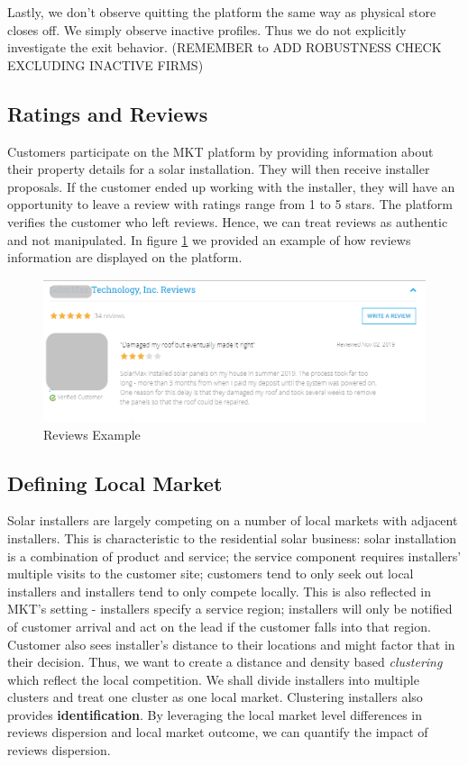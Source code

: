\documentclass[msom,blindrev]{informs3}
\begin{document}
Lastly, we don't observe quitting the platform the same way as physical store closes off. We simply observe inactive profiles. Thus we do not explicitly investigate the exit behavior. (REMEMBER to ADD ROBUSTNESS CHECK EXCLUDING INACTIVE FIRMS) 


\subsection{Ratings and Reviews}
Customers participate on the MKT platform by providing information about their property details for a solar installation. They will then receive installer proposals. If the customer ended up working with the installer, they will have an opportunity to leave a review with ratings range from 1 to 5 stars. The platform verifies the customer who left reviews. Hence, we can treat reviews as authentic and not manipulated. In figure \ref{reviews_example} we provided an example of how reviews information are displayed on the platform. 
\begin{figure}
	\centering
	\includegraphics[width=0.81\linewidth]{reviews_example.png}
	\caption{Reviews Example}
	\label{reviews_example}
\end{figure}


\subsection{Defining Local Market} 
\label{defining_local_market}
Solar installers are largely competing on a number of local markets with adjacent installers.  This is characteristic to the residential solar business: solar installation is a combination of product and service; the service component requires installers' multiple visits to the customer site;  customers tend to only seek out local installers and installers tend to only compete locally. This is also reflected in MKT's setting - installers specify a service region; installers will only be notified of customer arrival and act on the lead if the customer falls into that region. Customer also sees installer's distance to their locations and might factor that in their decision. Thus, we want to create a distance and density based \textit{clustering} which reflect the local competition. We shall divide installers into multiple clusters and treat one cluster as one local market. Clustering installers also provides \textbf{identification}. By leveraging the local market level differences in reviews dispersion and local market outcome, we can quantify the impact of reviews dispersion. \\ 
\end{document}
